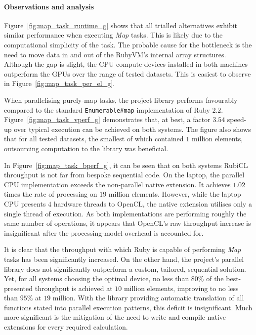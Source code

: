 \paragraph*{Observations and analysis}
Figure~\ref{fig:map_task_runtime_g} shows that all trialled alternatives exhibit similar performance when executing \emph{Map} tasks.
This is likely due to the computational simplicity of the task. The probable cause for the bottleneck is the need to move data in and out of the RubyVM's internal array structures.
Although the gap is slight, the \ac{CPU} compute-devices installed in both machines outperform the \acp{GPU} over the range of tested datasets. This is easiest to observe in Figure~\ref{fig:map_task_per_el_g}.

When parallelising purely-map tasks, the project library performs favourably compared to the standard \verb|Enumerable#map| implementation of Ruby $2.2$. Figure~\ref{fig:map_task_vperf_g} demonstrates that, at best, a factor $3.5$\textendash$4$ speed-up over typical execution can be achieved on both systems.
The figure also shows that for all tested datasets, the smallest of which contained $1$ million elements, outsourcing computation to the library was beneficial.

In Figure~\ref{fig:map_task_bperf_g}, it can be seen that on both systems RubiCL throughput is not far from bespoke sequential code. On the laptop, the parallel \ac{CPU} implementation exceeds the non-parallel native extension. It achieves $1.02$ times the rate of processing on $19$ million elements.
However, while the laptop \ac{CPU} presents $4$ hardware threads to \ac{OpenCL}, the native extension utilises only a single thread of execution. As both implementations are performing roughly the same number of operations, it appears that \ac{OpenCL}'s raw throughput increase is insignificant after the processing-model overhead is accounted for.

It is clear that the throughput with which Ruby is capable of performing \emph{Map} tasks has been significantly increased.
On the other hand, the project's parallel library does not significantly outperform a custom, tailored, sequential solution.
Yet, for all systems choosing the optimal device, no less than $80\%$ of the best-presented throughput is achieved at $10$ million elements, improving to no less than $95\%$ at $19$ million.
With the library providing automatic translation of all functions stated into parallel execution patterns, this deficit is insignificant. Much more significant is the mitigation of the need to write and compile native extensions for every required calculation.

